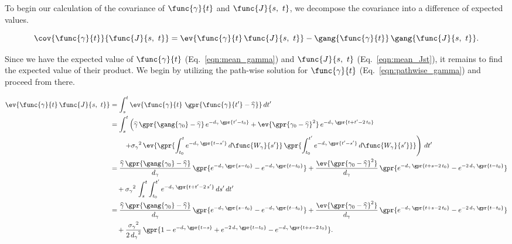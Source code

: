 To begin our calculation of the covariance of $\func{\gamma}{t}$ and $\func{J}{s,\ t}$, we decompose the covariance into a difference of expected values.

\begin{equation}
	\cov{\func{\gamma}{t}}{\func{J}{s,\ t}} = \ev{\func{\gamma}{t}\,\func{J}{s,\ t}} - \gang{\func{\gamma}{t}}\,\gang{\func{J}{s,\ t}}.
\end{equation}

Since we have the expected value of $\func{\gamma}{t}$ (Eq.~\ref{eqn:mean_gamma}) and $\func{J}{s,\ t}$ (Eq.~\ref{eqn:mean_Jst}), it remains to find the expected value of their product. We begin by utilizing the path-wise solution for $\func{\gamma}{t}$ (Eq.~\ref{eqn:pathwise_gamma}) and proceed from there.

\begin{align}
	\ev{\func{\gamma}{t}\,\func{J}{s,\ t}} &= \int_{s}^{t} \ev{\func{\gamma}{t}\,\,\gpr{\func{\gamma}{t'} - \widehat{\gamma}}}\,dt' \nonumber \\
		&= \int_{s}^{t} \left(\widehat{\gamma}\,\gpr{\gang{\gamma_0} - \widehat{\gamma}}\,e^{-d_{\gamma}\,\gpr{t' - t_0}} + \ev{\gpr{\gamma_0 - \widehat{\gamma}}^2}\,e^{-d_{\gamma}\,\gpr{t + t' - 2\,t_0}} \right. \nonumber \\
			&\qquad \left. + {\sigma_{\gamma}}^2\,\ev{\gpr{\int_{t_0}^{t} e^{-d_{\gamma}\,\gpr{t - s'}}\,d\func{W_{\gamma}}{s'}}\,\gpr{\int_{t_0}^{t'} e^{-d_{\gamma}\,\gpr{t' - s'}}\,d\func{W_{\gamma}}{s'}}}\right)\,dt' \nonumber \\
		&= \frac{\widehat{\gamma}\,\gpr{\gang{\gamma_0} - \widehat{\gamma}}}{d_{\gamma}}\,\gpr{e^{-d_{\gamma}\,\gpr{s - t_0}} - e^{-d_{\gamma}\,\gpr{t - t_0}}} + \frac{\ev{\gpr{\gamma_0 - \widehat{\gamma}}^2}}{d_{\gamma}}\,\gpr{e^{-d_{\gamma}\,\gpr{t + s - 2\,t_0}} - e^{-2\,d_{\gamma}\,\gpr{t - t_0}}} \nonumber \\
			&\quad + {\sigma_{\gamma}}^2\,\int_{s}^{t} \int_{t_0}^{t'} e^{-d_{\gamma}\,\gpr{t + t' - 2\,s'}}\,ds'\,dt' \nonumber \\
		&= \frac{\widehat{\gamma}\,\gpr{\gang{\gamma_0} - \widehat{\gamma}}}{d_{\gamma}}\,\gpr{e^{-d_{\gamma}\,\gpr{s - t_0}} - e^{-d_{\gamma}\,\gpr{t - t_0}}} + \frac{\ev{\gpr{\gamma_0 - \widehat{\gamma}}^2}}{d_{\gamma}}\,\gpr{e^{-d_{\gamma}\,\gpr{t + s - 2\,t_0}} - e^{-2\,d_{\gamma}\,\gpr{t - t_0}}} \nonumber \\
			&\quad + \frac{{\sigma_{\gamma}}^2}{2\,{d_{\gamma}}^2}\,\gpr{1 - e^{-d_{\gamma}\,\gpr{t - s}} + e^{-2\,d_{\gamma}\,\gpr{t - t_0}} - e^{-d_{\gamma}\,\gpr{t + s - 2\,t_0}}}.
\end{align}

